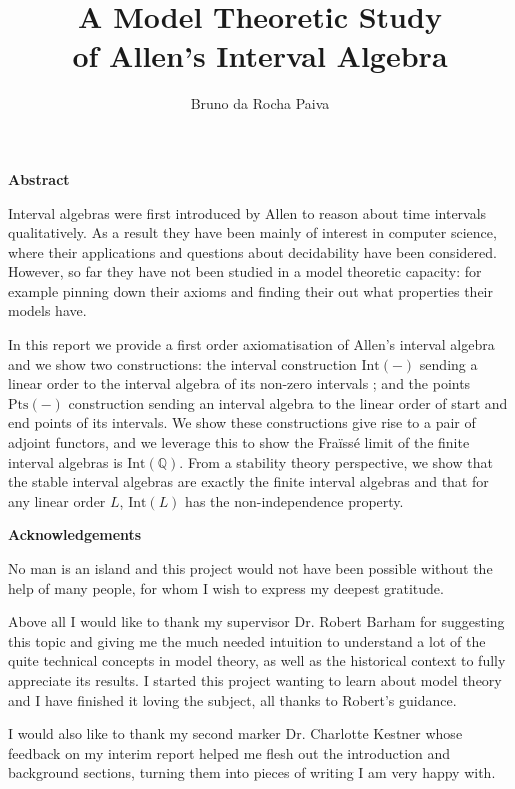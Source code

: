 \documentclass[11pt %
              ]{article}
\title{A Model Theoretic Study \\ of Allen's Interval Algebra}
\author{Bruno da Rocha Paiva}
\date{} %
\newcommand{\Q}{\mathbb{Q}}
\newcommand{\inter}[1][-]{\text{Int}\left(#1\right)}
\newcommand{\points}[1][-]{\text{Pts}\left(#1\right)}
\theoremstyle{plain}
\theoremstyle{definition}
\theoremstyle{remark}
\begin{document}
\pagestyle{empty}



\newpage
\hspace{0pt}
\vfill
\begin{center}
    \textbf{Abstract}
\end{center}
Interval algebras were first introduced by Allen to reason about time intervals qualitatively. As
a result they have been mainly of interest in computer science, where their applications and
questions about decidability have been considered. However, so far they have not been studied in a
model theoretic capacity: for example pinning down their axioms and finding their out what
properties their models have.

In this report we provide a first order axiomatisation of Allen's interval algebra and we show
two constructions: the interval construction $\inter$ sending a linear order to the interval algebra
of its non-zero intervals ; and the points $\points$ construction sending an interval algebra to
the linear order of start and end points of its intervals. We show these constructions give rise to
a pair of adjoint functors, and we leverage this to show the Fraïssé limit of the finite interval
algebras is $\inter[\Q]$. From a stability theory perspective, we show that the stable interval
algebras are exactly the finite interval algebras and that for any linear order $L$, $\inter[L]$
has the non-independence property.
\vfill
\hspace{0pt}

\newpage
\hspace{0pt}
\vfill
\begin{center}
    \textbf{Acknowledgements}
\end{center}
No man is an island and this project would not have been possible without the help of many people,
for whom I wish to express my deepest gratitude.

Above all I would like to thank my supervisor Dr. Robert Barham for suggesting this topic and
giving me the much needed intuition to understand a lot of the quite technical concepts in model
theory, as well as the historical context to fully appreciate its results. I started this project
wanting to learn about model theory and I have finished it loving the subject, all thanks to
Robert's guidance.

I would also like to thank my second marker Dr. Charlotte Kestner whose feedback on my interim
report helped me flesh out the introduction and background sections, turning them into pieces of
writing I am very happy with.
\end{document}
